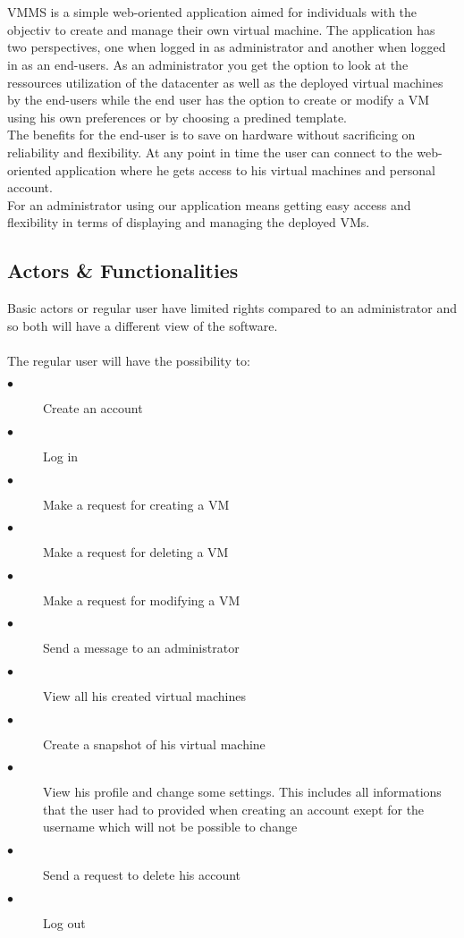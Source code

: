 \section{\mysystemname}

VMMS is a simple web-oriented application aimed for individuals with the
objectiv to create and manage their own virtual machine. The application    
has two perspectives, one when logged in as administrator and another when
logged in as an end-users. As an administrator you get the option to look at
the ressources utilization of the datacenter as well as the deployed virtual
machines by the end-users while the end user has the option to create or modify 
a VM using his own preferences or by choosing a predined template.\\The benefits
for the end-user is to save on hardware without sacrificing on reliability and 
flexibility. At any point in time the user can connect to the web-oriented
application where he gets access to his virtual machines and personal
account.\\For an administrator using our application means getting easy access
and flexibility in terms of displaying and managing the deployed VMs.

\subsection{Actors \& Functionalities}
Basic actors or regular user have limited rights compared to an administrator
and so both will have a different view of the software.\\\\The regular user will
have the possibility to:\\

\begin{description}
  \item[$\bullet$] Create an account
  \item[$\bullet$] Log in
  \item[$\bullet$] Make a request for creating a VM
  \item[$\bullet$] Make a request for deleting a VM
  \item[$\bullet$] Make a request for modifying a VM
  \item[$\bullet$] Send a message to an administrator
  \item[$\bullet$] View all his created virtual machines
  \item[$\bullet$] Create a snapshot of his virtual machine
  \item[$\bullet$] View his profile and change some settings. This includes all
  informations that the user had to provided when creating an account exept for
  the username which will not be possible to change
  \item[$\bullet$] Send a request to delete his account
  \item[$\bullet$] Log out
\end{description}



